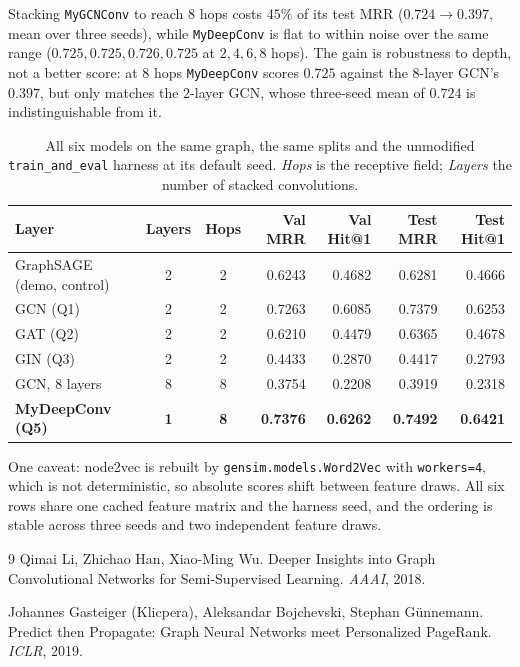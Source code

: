 \noindent
Stacking \texttt{MyGCNConv} to reach $8$ hops costs $45\%$ of its test MRR
($0.724 \to 0.397$, mean over three seeds), while \texttt{MyDeepConv} is flat to within
noise over the same range ($0.725, 0.725, 0.726, 0.725$ at $2, 4, 6, 8$ hops). The gain
is robustness to depth, not a better score: at $8$ hops \texttt{MyDeepConv} scores
$0.725$ against the $8$-layer GCN's $0.397$, but only matches the $2$-layer GCN, whose
three-seed mean of $0.724$ is indistinguishable from it.

\begin{table}[H]
  \centering
  \setlength{\tabcolsep}{4.5pt}%
  \begin{tabular}{lccrrrr}
    \toprule
    Layer & Layers & Hops & Val MRR & Val Hit@1 & Test MRR & Test Hit@1 \\
    \midrule
    GraphSAGE (demo, control) & 2 & 2 & 0.6243 & 0.4682 & 0.6281 & 0.4666 \\
    GCN (Q1)                  & 2 & 2 & 0.7263 & 0.6085 & 0.7379 & 0.6253 \\
    GAT (Q2)                  & 2 & 2 & 0.6210 & 0.4479 & 0.6365 & 0.4678 \\
    GIN (Q3)                  & 2 & 2 & 0.4433 & 0.2870 & 0.4417 & 0.2793 \\
    GCN, 8 layers             & 8 & 8 & 0.3754 & 0.2208 & 0.3919 & 0.2318 \\
    \textbf{MyDeepConv (Q5)}  & \textbf{1} & \textbf{8} & \textbf{0.7376} &
      \textbf{0.6262} & \textbf{0.7492} & \textbf{0.6421} \\
    \bottomrule
  \end{tabular}
  \caption{All six models on the same graph, the same splits and the unmodified
  \texttt{train\_and\_eval} harness at its default seed. \emph{Hops} is the
  receptive field; \emph{Layers} the number of stacked convolutions.}
  \label{p1:tab:results}
\end{table}

\noindent
One caveat: node2vec is rebuilt by \texttt{gensim.models.Word2Vec} with
\texttt{workers=4}, which is not deterministic, so absolute scores shift between feature
draws. All six rows share one cached feature matrix and the harness seed, and the
ordering is stable across three seeds and two independent feature draws.

\begin{thebibliography}{9}
Qimai Li, Zhichao Han, Xiao-Ming Wu.
\newblock Deeper Insights into Graph Convolutional Networks for Semi-Supervised
Learning.
\newblock \emph{AAAI}, 2018.

Johannes Gasteiger (Klicpera), Aleksandar Bojchevski, Stephan G\"unnemann.
\newblock Predict then Propagate: Graph Neural Networks meet Personalized PageRank.
\newblock \emph{ICLR}, 2019.
\end{thebibliography}
